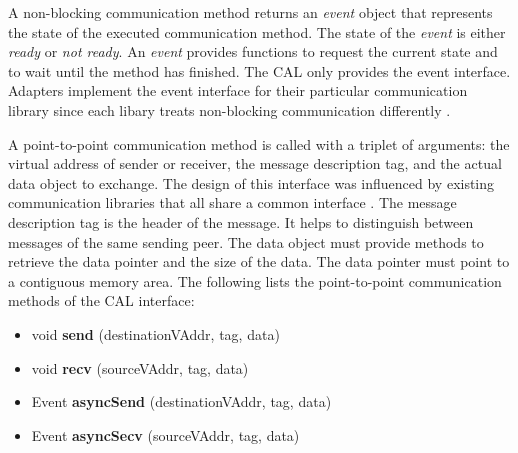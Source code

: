 A non-blocking communication method returns an \emph{event} object that represents
the state of the executed communication method. The state
of the \emph{event} is either \emph{ready} or \emph{not ready}. An
\emph{event} provides functions to request the current state and 
to  wait until the method has finished. The CAL only provides the
event interface. Adapters implement the  event interface for their
particular communication library since each libary treats non-blocking
communication differently \cite{ref:mpi_specification,ref:boost_asio}.

A point-to-point communication method is called with a triplet of
arguments: the virtual address of sender or receiver, the message
description tag, and the actual data object to exchange.  The design
of this interface was influenced by existing communication libraries
that all share a common interface \cite{ref:boost_mpi, ref:boost_asio,
  ref:zmq}. The message description tag is the header of the
message. It helps to distinguish between messages of the same sending
peer.  The data object must provide methods to retrieve the data
pointer and the size of the data. The data pointer must point to a
contiguous memory area. The following lists the point-to-point
communication methods of the CAL interface:

\begin{itemize}

  \item  void \textbf{send }(destinationVAddr, tag, data)
  \item  void \textbf{recv }(sourceVAddr, tag, data)
  \item  Event \textbf{asyncSend }(destinationVAddr, tag, data)
  \item  Event \textbf{asyncSecv }(sourceVAddr, tag, data)

\end{itemize}

